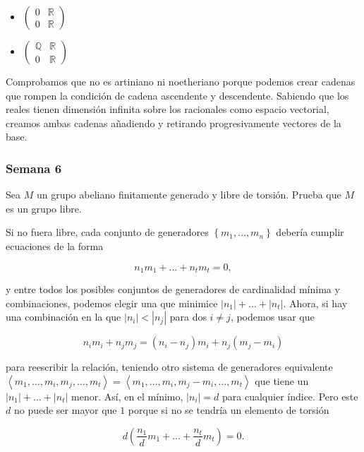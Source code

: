 \documentclass[11pt]{article}
\begin{document}
\begin{itemize}
\begin{itemize}
\begin{itemize}
\item $\begin{pmatrix} 0 & \mathbb{R} \\ 0 & \mathbb{R} \end{pmatrix}$

\item $\begin{pmatrix} \mathbb{Q} & \mathbb{R} \\ 0 & \mathbb{R} \end{pmatrix}$
\end{itemize}

Comprobamos que no es artiniano ni noetheriano porque podemos crear
cadenas que rompen la condición de cadena ascendente y descendente.
Sabiendo que los reales tienen dimensión infinita sobre los racionales
como espacio vectorial, creamos ambas cadenas añadiendo y retirando
progresivamente vectores de la base.
\end{itemize}
\end{itemize}

\subsubsection*{Semana 6}
\label{sec-7-4-5}
\begin{statement}
Sea $M$ un grupo abeliano finitamente generado y libre de torsión.
Prueba que $M$ es un grupo libre.
\end{statement}

Si no fuera libre, cada conjunto de generadores
$\left\{ m_1,\dots,m_{n} \right\}$ debería cumplir ecuaciones de la forma

\[n_1m_1+ \dots + n_tm_t = 0,\]

y entre todos los posibles conjuntos de generadores de cardinalidad
mínima y combinaciones, podemos elegir una que minimice $|n_1|+\dots + |n_t|$.
Ahora, si hay una combinación en la que $|n_i|<|n_j|$ para dos $i\neq j$,
podemos usar que

\[
n_im_i + n_jm_j = (n_i-n_j)m_i + n_{j}(m_j-m_i)
\]

para reescribir la relación, teniendo otro sistema de generadores
equivalente $\left\langle m_1,\dots,m_i,m_j,\dots,m_{t} \right\rangle = \left\langle m_1,\dots,m_i,m_j-m_i,\dots,m_t \right\rangle$ que
tiene un $|n_1|+\dots + |n_t|$ menor. Así, en el mínimo, $|n_i| = d$ para cualquier
índice. Pero este $d$ no puede ser mayor que $1$ porque si no se tendría un
elemento de torsión

\[
d \left( \frac{n_1}{d}m_1 + \dots + \frac{n_t}{d}m_t \right) = 0.
\]
\end{document}
